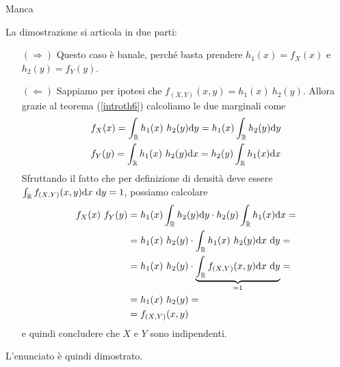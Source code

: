 \ParteSoluzioni

\Soluzione{}
Manca

\Soluzione{}
La dimostrazione si articola in due parti:
\begin{enumerate}
\item [$(\Rightarrow)$] Questo caso è banale, perché basta prendere $h_1(x)=f_X(x)$ e $h_2(y)=f_Y(y)$.

\item [$(\Leftarrow)$] Sappiamo per ipotesi che $f_{(X,Y)}(x,y)=h_1(x)\ h_2(y)$. Allora grazie al teorema (\ref{introth6}) calcoliamo le due marginali come
\begin{gather*}
\begin{aligned}
&f_X(x)=\int_{\mathbb{R}} h_1(x)\ h_2(y) \mathrm{d} y=h_1(x)\int_{\mathbb{R}} h_2(y) \mathrm{d} y \\
&f_Y(y)=\int_{\mathbb{R}} h_1(x)\ h_2(y) \mathrm{d} x=h_2(y)\int_{\mathbb{R}} h_1(x) \mathrm{d} x
\end{aligned}
\end{gather*}
Sfruttando il fatto che per definizione di densità deve essere $\int_{\mathbb{R}}f_{(X,Y)}(x,y)\mathrm{d} x\ \mathrm{d} y=1$, possiamo calcolare
\begin{gather*}
\begin{aligned}
f_X(x)\ f_Y(y)&=h_1(x)\int_{\mathbb{R}} h_2(y) \mathrm{d} y\cdot h_2(y)\int_{\mathbb{R}} h_1(x) \mathrm{d} x=\\
&=h_1(x)\ h_2(y) \cdot \int_{\mathbb{R}} h_1(x)\ h_2(y) \mathrm{d} x\ \mathrm{d} y=\\
&=h_1(x)\ h_2(y) \cdot \underbrace{\int_{\mathbb{R}} f_{(X,Y)}(x,y) \mathrm{d} x\ \mathrm{d} y}_{=1}=\\
&=h_1(x)\ h_2(y)=\\
&=f_{(X,Y)}(x,y)
\end{aligned}
\end{gather*}
e quindi concludere che $X$ e $Y$ sono indipendenti.
\end{enumerate}
L'enunciato è quindi dimostrato.

